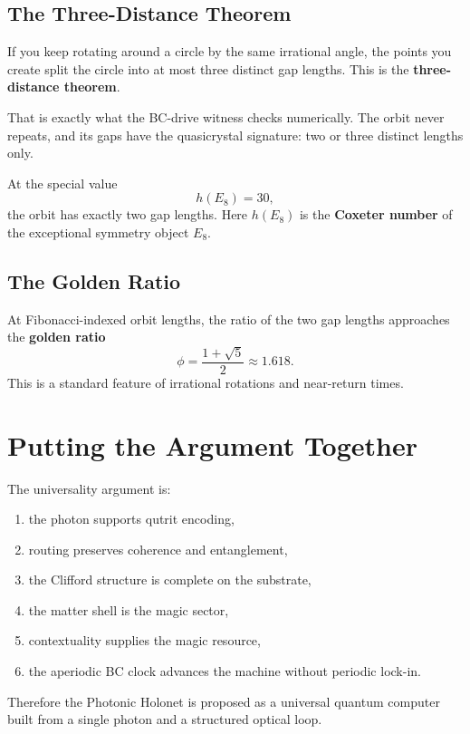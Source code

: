 \documentclass[11pt]{article}
\begin{document}
\subsection{The Three-Distance Theorem}
If you keep rotating around a circle by the same irrational angle, the points you create split the circle into at most three distinct gap lengths. This is the \textbf{three-distance theorem}.

That is exactly what the BC-drive witness checks numerically. The orbit never repeats, and its gaps have the quasicrystal signature: two or three distinct lengths only.

At the special value
\begin{equation}
 h(E_8) = 30,
\end{equation}
the orbit has exactly two gap lengths. Here \(h(E_8)\) is the \textbf{Coxeter number} of the exceptional symmetry object \(E_8\).

\subsection{The Golden Ratio}
At Fibonacci-indexed orbit lengths, the ratio of the two gap lengths approaches the \textbf{golden ratio}
\begin{equation}
\phi = \frac{1+\sqrt{5}}{2} \approx 1.618.
\end{equation}
This is a standard feature of irrational rotations and near-return times.

\section{Putting the Argument Together}
The universality argument is:
\begin{enumerate}[leftmargin=1.5em]
    \item the photon supports qutrit encoding,
    \item routing preserves coherence and entanglement,
    \item the Clifford structure is complete on the substrate,
    \item the matter shell is the magic sector,
    \item contextuality supplies the magic resource,
    \item the aperiodic BC clock advances the machine without periodic lock-in.
\end{enumerate}
Therefore the Photonic Holonet is proposed as a universal quantum computer built from a single photon and a structured optical loop.
\end{document}
